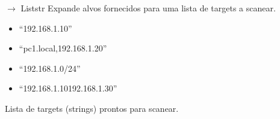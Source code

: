 \documentclass[letterpaper,10pt,english]{sphinxmanual}
\begin{document}
\begin{fulllineitems}

\begin{fulllineitems}
\label{\detokenize{modules:modules.port_scanner.ScanResult.service}}
\pysigstartsignatures
\pysigline
{}
\pysigstopsignatures
\end{fulllineitems}


\end{fulllineitems}


\begin{fulllineitems}
\label{\detokenize{modules:modules.port_scanner.expand_targets}}
\pysigstartsignatures
\pysiglinewithargsret
{}
{}
{{ $\rightarrow$ List\DUrole{p}{{[}}str\DUrole{p}{{]}}}}
\pysigstopsignatures
\sphinxAtStartPar
Expande alvos fornecidos para uma lista de targets a scanear.
\begin{description}
\begin{itemize}
\item {} 
\sphinxAtStartPar
“192.168.1.10”

\item {} 
\sphinxAtStartPar
“pc1.local,192.168.1.20”

\item {} 
\sphinxAtStartPar
“192.168.1.0/24”

\item {} 
\sphinxAtStartPar
“192.168.1.10\sphinxhyphen{}192.168.1.30”

\end{itemize}

\sphinxAtStartPar
Lista de targets (strings) prontos para scanear.

\end{description}

\end{fulllineitems}

\end{document}

